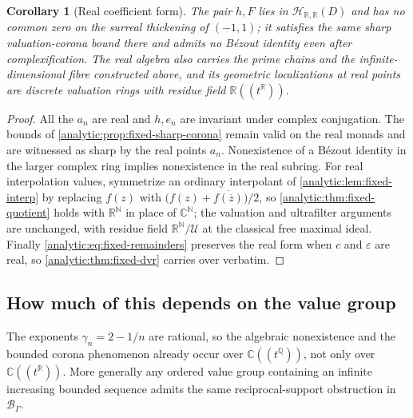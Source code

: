 \documentclass[11pt,letterpaper]{article}
\newtheorem{corollary}[theorem]{Corollary}
\theoremstyle{definition}
\theoremstyle{remark}
\newcommand{\C}{\mathbb C}
\newcommand{\R}{\mathbb R}
\newcommand{\Q}{\mathbb Q}
\newcommand{\N}{\mathbb N}
\newcommand{\HH}{\mathcal H}
\newcommand{\BB}{\mathcal B}
\newcommand{\UU}{\mathcal U}
\numberwithin{equation}{section}
\begin{document}
\begin{corollary}[Real coefficient form]\label{analytic:cor:fixed-real}
The pair $h,F$ lies in $\HH_{\R,\R}(D)$ and has no common zero on the
surreal thickening of $(-1,1)$; it satisfies the same sharp
valuation-corona bound there and admits no B\'ezout identity even after
complexification. The real algebra also carries the prime chains and the
infinite-dimensional fibre constructed above, and its geometric
localizations at real points are discrete valuation rings with residue
field $\R((t^\R))$.
\end{corollary}
\begin{proof}
All the $a_n$ are real and $h,e_n$ are invariant under complex
conjugation. The bounds of \cref{analytic:prop:fixed-sharp-corona} remain
valid on the real monads and are witnessed as sharp by the real points
$a_n$. Nonexistence of a B\'ezout identity in the larger complex ring
implies nonexistence in the real subring. For real interpolation values,
symmetrize an ordinary interpolant of \cref{analytic:lem:fixed-interp} by
replacing $f(z)$ with $\bigl(f(z)+\overline{f(\overline z)}\bigr)/2$, so
\cref{analytic:thm:fixed-quotient} holds with $\R^\N$ in place of $\C^\N$;
the valuation and ultrafilter arguments are unchanged, with residue field
$\R^\N/\UU$ at the classical free maximal ideal. Finally
\eqref{analytic:eq:fixed-remainders} preserves the real form when $c$ and
$\varepsilon$ are real, so \cref{analytic:thm:fixed-dvr} carries over
verbatim.
\end{proof}

\subsection{How much of this depends on the value group}
\label{analytic:subsec:fixed-value-group}
The exponents $\gamma_n=2-1/n$ are rational, so the algebraic
nonexistence and the bounded corona phenomenon already occur over
$\C((t^\Q))$, not only over $\C((t^\R))$. More generally any ordered value
group containing an infinite increasing bounded sequence admits the same
reciprocal-support obstruction in $\BB_\Gamma$.
\end{document}
